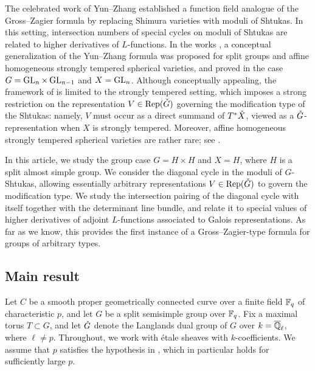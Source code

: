 \documentclass[reqno]{amsart}
\numberwithin{equation}{section}
\numberwithin{equation}{section}
\begin{document}
The celebrated work of Yun--Zhang \cite{YZ1} established a function field analogue of the Gross--Zagier formula by replacing Shimura varieties with moduli of Shtukas. In this setting, intersection numbers of special cycles on moduli of Shtukas are related to higher derivatives of $L$-functions. In the works \cite{liu2025higherperiodintegralsderivatives,wang2025specialcycleshtukascategorical}, a conceptual generalization of the Yun--Zhang formula was proposed for split groups and affine homogeneous strongly tempered spherical varieties, and proved in the case $G=\operatorname{GL}_n\times \operatorname{GL}_{n-1}$ and $X=\operatorname{GL}_n$. Although conceptually appealing, the framework of \cite{liu2025higherperiodintegralsderivatives,wang2025specialcycleshtukascategorical} is limited to the strongly tempered setting, which imposes a strong restriction on the representation $V\in \operatorname{Rep}(\check{G})$ governing the modification type of the Shtukas: namely, $V$ must occur as a direct summand of $T^*\check{X}$, viewed as a $\check{G}$-representation when $X$ is strongly tempered. Moreover, affine homogeneous strongly tempered spherical varieties are rather rare; see \cite{wan2025periods}.

In this article, we study the group case $G=H\times H$ and $X=H$, where $H$ is a split almost simple group. We consider the diagonal cycle in the moduli of $G$-Shtukas, allowing essentially arbitrary representations $V\in \operatorname{Rep}(\check{G})$ to govern the modification type. We study the intersection pairing of the diagonal cycle with itself together with the determinant line bundle, and relate it to special values of higher derivatives of adjoint $L$-functions associated to Galois representations. As far as we know, this provides the first instance of a Gross--Zagier-type formula for groups of arbitrary types.



\subsection{Main result}

Let $C$ be a smooth proper geometrically connected curve over a finite field $\mathbb{F}_q$ of characteristic $p$, and let $G$ be a split semisimple group over $\mathbb{F}_q$. Fix a maximal torus $T\subset G$, and let $\check{G}$ denote the Langlands dual group of $G$ over $k=\overline{\mathbb{Q}}_\ell$, where $\ell\neq p$. Throughout, we work with \'etale sheaves with $k$-coefficients. We assume that $p$ satisfies the hypothesis in \cite[\S0.1.9]{gaitsgory2025geometriclanglandspositivecharacteristic}, which in particular holds for sufficiently large $p$.
\end{document}
